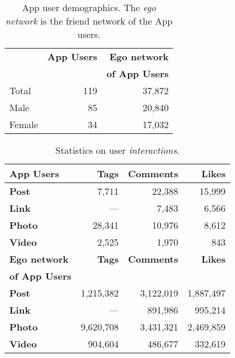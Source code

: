 \begin{table}[t!]
\centering
\begin{tabular}{|>{\small}l|>{\small}r|>{\small}r|}
\hline
& \textbf{App Users} & \textbf{Ego network} \\
& & \textbf{of App Users} \\
\hline
Total & 119 & 37,872 \\
\hline \hline
Male & 85 & 20,840 \\
\hline
Female & 34 & 17,032 \\
\hline
\end{tabular}
\caption{App user demographics.  The \emph{ego network} is the friend
network of the App users.}
\label{tab:demographics}
\end{table}

\begin{table}[t!]
\centering
\begin{tabular}{|>{\small}l|>{\small}r|>{\small}r|>{\small}r|}
\hline
\textbf{App Users} & \textbf{Tags} & \textbf{Comments} & \textbf{Likes} \\
\hline
\textbf{Post} & 7,711 & 22,388 & 15,999 \\
\hline
\textbf{Link}  & --- & 7,483 & 6,566 \\
\hline
\textbf{Photo} & 28,341 & 10,976 & 8,612 \\
\hline
\textbf{Video} & 2,525 & 1,970 & 843 \\
\hline
\hline
\textbf{Ego network} & \textbf{Tags} & \textbf{Comments} & \textbf{Likes} \\
\textbf{of App Users}  & & & \\
\hline
\textbf{Post} & 1,215,382 & 3,122,019 & 1,887,497 \\
\hline
\textbf{Link} & --- & 891,986 & 995,214 \\
\hline
\textbf{Photo} & 9,620,708 & 3,431,321 & 2,469,859 \\
\hline
\textbf{Video} & 904,604 & 486,677 & 332,619 \\
\hline
\end{tabular}
\caption{Statistics on user {\em interactions}.
}
\label{tab:interactions}
\end{table}

